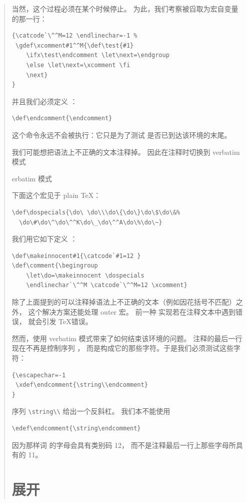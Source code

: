 \documentclass[a4paper]{rapport3}
\newenvironment{disp}{\begin{quotation}}{\end{quotation}}
\def\term#1\par{\index{#1}}
\begin{document}
\begin{disp}
当然，这个过程必须在某个时候停止。
为此，我们考察被舀取为宏自变量的那一行：
\begin{verbatim}
{\catcode`\^^M=12 \endlinechar=-1 %
 \gdef\xcomment#1^^M{\def\test{#1}
    \ifx\test\endcomment \let\next=\endgroup
    \else \let\next=\xcomment \fi
    \next}
}
\end{verbatim}
并且我们必须定义 ：
\begin{verbatim}
\def\endcomment{\endcomment}
\end{verbatim}
这个命令永远不会被执行：它只是为了测试
是否已到达该环境的末尾。

我们可能想把语法上不正确的文本注释掉。
因此在注释时切换到 verbatim 模式
\term verbatim 模式\par
下面这个宏见于 plain \TeX：
\begin{verbatim}
\def\dospecials{\do\ \do\\\do\{\do\}\do\$\do\&%
  \do\#\do\^\do\^^K\do\_\do\^^A\do\%\do\~}
\end{verbatim}
我们用它如下定义 ：
\begin{verbatim}
\def\makeinnocent#1{\catcode`#1=12 }
\def\comment{\begingroup
    \let\do=\makeinnocent \dospecials
    \endlinechar`\^^M \catcode`\^^M=12 \xcomment}
\end{verbatim}
除了上面提到的可以注释掉语法上不正确的文本（例如因花括号不匹配）之外，
这个解决方案还能处理 outer 宏。
前一种  实现若在注释文本中遇到错误，
就会引发 \TeX 错误。

然而，使用 verbatim 模式带来了如何结束该环境的问题。
\altt
注释的最后一行现在不再是控制序列 ，
而是构成它的那些字符。于是我们必须测试这些字符：
\begin{verbatim}
{\escapechar=-1
 \xdef\endcomment{\string\\endcomment}
}
\end{verbatim}
序列 \verb>\string\\> 给出一个反斜杠。
我们本不能使用
\begin{verbatim}
\edef\endcomment{\string\endcomment}
\end{verbatim}
因为那样词  的字母会具有类别码 12，
而不是注释最后一行上那些字母所具有的 11。


\endofchapter
\chapter{展开}\label{expand}


\end{disp}
\end{document}
